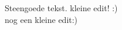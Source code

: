 \documentclass[10pt]{report}
\begin{document}
Steengoede tekst.
kleine edit! :)\\
nog een kleine edit:)
\end{document}
